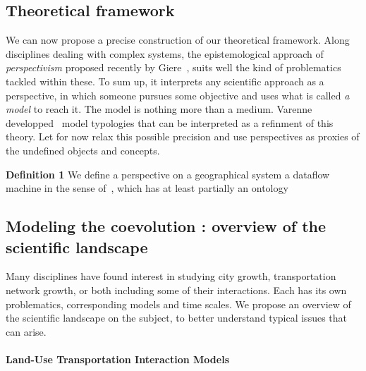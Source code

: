 \subsection{Theoretical framework}


We can now propose a precise construction of our theoretical framework. Along disciplines dealing with complex systems, the epistemological approach of \emph{perspectivism} proposed recently by Giere~\cite{giere2010scientific}, suits well the kind of problematics tackled within these. To sum up, it interprets any scientific approach as a perspective, in which someone pursues some objective and uses what is called \emph{a model} to reach it. The model is nothing more than a medium. Varenne developped~\cite{varenne2010framework} model typologies that can be interpreted as a refinment of this theory. Let for now relax this possible precision and use perspectives as proxies of the undefined objects and concepts.

\textbf{Definition 1} We define a perspective on a geographical system a dataflow machine in the sense of~\cite{golden2012modeling}, which has at least partially an ontology 



\subsection{Modeling the coevolution : overview of the scientific landscape}


Many disciplines have found interest in studying city growth, transportation network growth, or both including some of their interactions. Each has its own problematics, corresponding models and time scales. We propose an overview of the scientific landscape on the subject, to better understand typical issues that can arise.

\paragraph{Land-Use Transportation Interaction Models}

